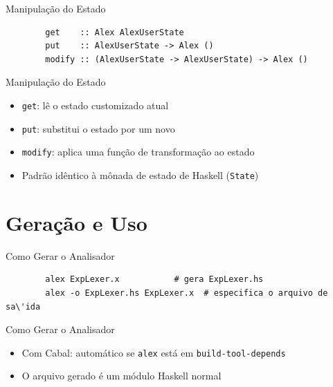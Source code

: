 \begin{frame}[fragile]{Manipulação do Estado}

    \begin{lstlisting}
        get    :: Alex AlexUserState
        put    :: AlexUserState -> Alex ()
        modify :: (AlexUserState -> AlexUserState) -> Alex ()
    \end{lstlisting}
\end{frame}

\begin{frame}[fragile]{Manipulação do Estado}

    \begin{itemize}

        \item
        \texttt{get}: lê o estado customizado atual
        \item
        \texttt{put}: substitui o estado por um novo
        \item
        \texttt{modify}: aplica uma função de transformação
        ao estado
        \item
        Padrão idêntico à mônada de estado de Haskell
        (\texttt{State})
    \end{itemize}
\end{frame}


\section{Geração e Uso}\label{gerauxe7uxe3o-e-uso}

\begin{frame}[fragile]{Como Gerar o Analisador}

    \begin{lstlisting}
        alex ExpLexer.x           # gera ExpLexer.hs
        alex -o ExpLexer.hs ExpLexer.x  # especifica o arquivo de sa\'ida
    \end{lstlisting}
\end{frame}

\begin{frame}[fragile]{Como Gerar o Analisador}

    \begin{itemize}

        \item
        Com Cabal: automático se \texttt{alex} está em
        \texttt{build-tool-depends}
        \item
        O arquivo gerado é um módulo Haskell normal
    \end{itemize}
\end{frame}

